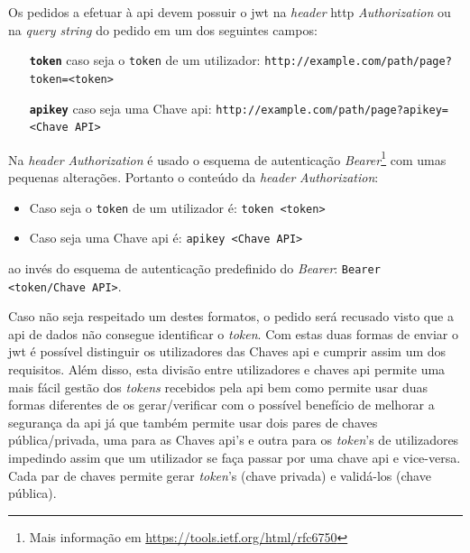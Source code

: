 Os pedidos a efetuar à \acrshort{api} devem possuir o \acrshort{jwt} na \textit{header} \acrshort{http} \textit{Authorization} ou na \textit{query string} do pedido em um dos seguintes campos:
\begin{itemize}[leftmargin=3cm]
    \item[\textbf{\texttt{token}}] caso seja o \texttt{token} de um utilizador:\newline
        \verb|http://example.com/path/page?token=<token>|
    \item[\textbf{\texttt{apikey}}] caso seja uma Chave \acrshort{api}:\newline
        \verb|http://example.com/path/page?apikey=<Chave API>|
\end{itemize}

Na \textit{header} \textit{Authorization} é usado o esquema de autenticação \textit{Bearer}\footnote{Mais informação em \url{https://tools.ietf.org/html/rfc6750}} com umas pequenas alterações. Portanto o conteúdo da \textit{header} \textit{Authorization}:
\begin{itemize}[leftmargin=2cm]
    \item Caso seja o \texttt{token} de um utilizador é:\newline
        \verb|token <token>|
    \item Caso seja uma Chave \acrshort{api} é:\newline
        \verb|apikey <Chave API>|
\end{itemize}
ao invés do esquema de autenticação predefinido do \textit{Bearer}: \verb|Bearer <token/Chave API>|.

Caso não seja respeitado um destes formatos, o pedido será recusado visto que a \acrshort{api} de dados não consegue identificar o \textit{token}.
Com estas duas formas de enviar o \acrshort{jwt} é possível distinguir os utilizadores das Chaves \acrshort{api} e cumprir assim um dos requisitos. Além disso, esta divisão entre utilizadores e chaves \acrshort{api} permite uma mais fácil gestão dos \textit{tokens} recebidos pela \acrshort{api} bem como permite usar duas formas diferentes de os gerar/verificar com o possível benefício de melhorar a segurança da \acrshort{api} já que também permite usar dois pares de chaves pública/privada, uma para as Chaves \acrshort{api}'s e outra para os \textit{token}'s de utilizadores impedindo assim que um utilizador se faça passar por uma chave \acrshort{api} e vice-versa. Cada par de chaves permite gerar \textit{token}'s (chave privada) e validá-los (chave pública).

